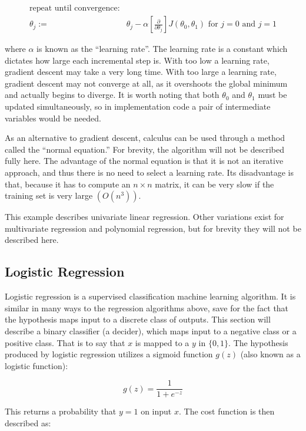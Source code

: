 \begin{align*} 
\text{repeat until convergence:} & \\
\theta_j := & \theta_j - \alpha[\frac{\partial}{\partial\theta_j}]J(\theta_0, \theta_1) \text{ for } j = 0 \text{ and } j = 1
\end{align*} 


where \(\alpha\) is known as the ``learning rate''. The learning rate is a constant which dictates how large each incremental step is. With too low a learning rate, gradient descent may take a very long time. With too large a learning rate, gradient descent may not converge at all, as it overshoots the global minimum and actually begins to diverge. It is worth noting that both \(\theta_0\) and \(\theta_1\) must be updated simultaneously, so in implementation code a pair of intermediate variables would be needed.

As an alternative to gradient descent, calculus can be used through a method called the ``normal equation.'' For brevity, the algorithm will not be described fully here. The advantage of the normal equation is that it is not an iterative approach, and thus there is no need to select a learning rate. Its disadvantage is that, because it has to compute an \(n \times n\) matrix, it can be very slow if the training set is very large \((O(n^3))\).

This example describes univariate linear regression. Other variations exist for multivariate regression and polynomial regression, but for brevity they will not be described here. 


\subsection{Logistic Regression}

Logistic regression is a supervised classification machine learning algorithm. It is similar in many ways to the regression algorithms above, save for the fact that the hypothesis maps input to a discrete class of outputs. This section will describe a binary classifier (a decider), which maps input to a negative class or a positive class. That is to say that \(x\) is mapped to a \(y\) in \(\{0, 1\}\). The hypothesis produced by logistic regression utilizes a sigmoid function \(g(z)\) (also known as a logistic function):

\[g(z)=\frac{1}{1+e^{-z}}\]

This returns a probability that \(y = 1\) on input \(x\). The cost function is then described as:

